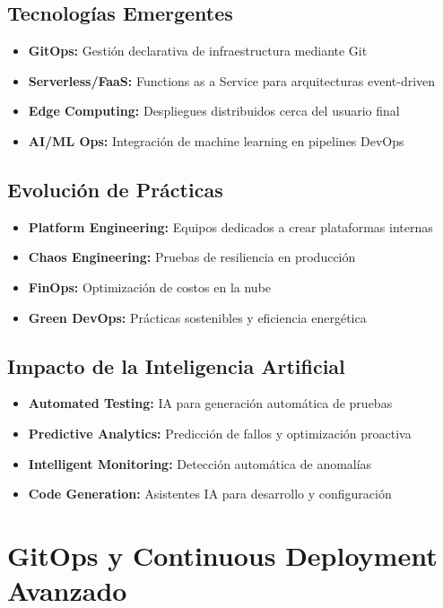 \documentclass[12pt,a4paper]{article}
\begin{document}
\subsection{Tecnologías Emergentes}
\begin{itemize}
    \item \textbf{GitOps:} Gestión declarativa de infraestructura mediante Git
    \item \textbf{Serverless/FaaS:} Functions as a Service para arquitecturas event-driven
    \item \textbf{Edge Computing:} Despliegues distribuidos cerca del usuario final
    \item \textbf{AI/ML Ops:} Integración de machine learning en pipelines DevOps
\end{itemize}

\subsection{Evolución de Prácticas}
\begin{itemize}
    \item \textbf{Platform Engineering:} Equipos dedicados a crear plataformas internas
    \item \textbf{Chaos Engineering:} Pruebas de resiliencia en producción
    \item \textbf{FinOps:} Optimización de costos en la nube
    \item \textbf{Green DevOps:} Prácticas sostenibles y eficiencia energética
\end{itemize}

\subsection{Impacto de la Inteligencia Artificial}
\begin{itemize}
    \item \textbf{Automated Testing:} IA para generación automática de pruebas
    \item \textbf{Predictive Analytics:} Predicción de fallos y optimización proactiva
    \item \textbf{Intelligent Monitoring:} Detección automática de anomalías
    \item \textbf{Code Generation:} Asistentes IA para desarrollo y configuración
\end{itemize}

\section{GitOps y Continuous Deployment Avanzado}
\end{document}
